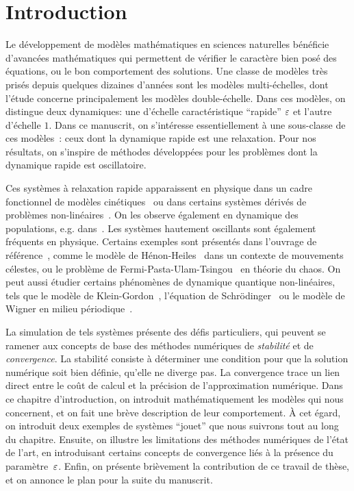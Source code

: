\chapter*{Introduction}


Le développement de modèles mathématiques en sciences naturelles
bénéficie d'avancées mathématiques qui permettent de vérifier le
caractère bien posé des équations, ou le bon comportement des solutions.
Une classe de modèles très prisés depuis quelques dizaines d'années sont
les modèles multi-échelles, dont l'étude concerne principalement les
modèles double-échelle. Dans ces modèles, on distingue deux dynamiques:
une d'échelle caractéristique \enquote{rapide} $\varepsilon$ et l'autre
d'échelle $1$. Dans ce manuscrit, on s'intéresse essentiellement à une
sous-classe de ces modèles~: ceux dont la dynamique rapide est une
relaxation. Pour nos résultats, on s'inspire de méthodes développées
pour les problèmes dont la dynamique rapide est oscillatoire. 


Ces systèmes à relaxation rapide apparaissent en physique dans un cadre
fonctionnel de modèles cinétiques~\cite{bhatnagar.1954.model,
lemou.2008.new} ou dans certains systèmes dérivés de problèmes
non-linéaires~\cite{jin.1995.relaxation}. On les observe également en
dynamique des populations, e.g. dans~\cite{greiner.1994.singular,
auger.1996.emergence, sanchez.2000.singular, castella.2018.analysis}.
Les systèmes hautement oscillants sont également fréquents en physique.
Certains exemples sont présentés dans l'ouvrage de
référence~\cite[Chap.~I]{hairer.2006.geometric}, comme le modèle de
Hénon-Heiles~\cite{henon.1964.applicability} dans un contexte de
mouvements célestes, ou le problème de
Fermi-Pasta-Ulam-Tsingou~\cite{ford.1992.fermi} en théorie du chaos. On peut aussi étudier certains phénomènes
de dynamique quantique non-linéaires, tels que le modèle de
Klein-Gordon~\cite{bao.2012.analysis}, l'équation de
Schrödinger~\cite{grebert.2011.energy} ou le modèle de Wigner en milieu
périodique~\cite{crouseilles.2017.nonlinear, morandi.2011.wigner}.


La simulation de tels systèmes présente des défis particuliers, qui peuvent se ramener aux concepts de base des méthodes numériques de \textit{stabilité} et de \textit{convergence}. La stabilité consiste à déterminer une condition pour que la solution numérique soit bien définie, qu'elle ne diverge pas. La convergence trace un lien direct entre le coût de calcul et la précision de l'approximation numérique. Dans ce chapitre d'introduction, on introduit mathématiquement les modèles qui nous concernent, et on fait une brève description de leur comportement. À cet égard, on introduit deux exemples de systèmes \enquote{jouet} que nous suivrons tout au long du chapitre. Ensuite, on illustre les limitations des méthodes numériques de l'état de l'art, en introduisant certains concepts de convergence liés à la présence du paramètre~$\varepsilon$. Enfin, on présente brièvement la contribution de ce travail de thèse, et on annonce le plan pour la suite du manuscrit. 


